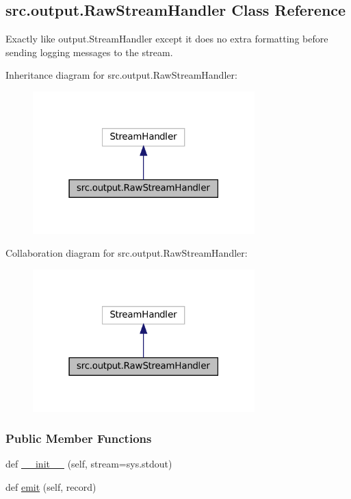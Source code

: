\hypertarget{classsrc_1_1output_1_1RawStreamHandler}{}\subsection{src.\+output.\+Raw\+Stream\+Handler Class Reference}
\label{classsrc_1_1output_1_1RawStreamHandler}


Exactly like output.\+Stream\+Handler except it does no extra formatting before sending logging messages to the stream.  




Inheritance diagram for src.\+output.\+Raw\+Stream\+Handler\+:
\nopagebreak
\begin{figure}[H]
\begin{center}
\leavevmode
\includegraphics[width=243pt]{classsrc_1_1output_1_1RawStreamHandler__inherit__graph}
\end{center}
\end{figure}


Collaboration diagram for src.\+output.\+Raw\+Stream\+Handler\+:
\nopagebreak
\begin{figure}[H]
\begin{center}
\leavevmode
\includegraphics[width=243pt]{classsrc_1_1output_1_1RawStreamHandler__coll__graph}
\end{center}
\end{figure}
\subsubsection*{Public Member Functions}
\begin{DoxyCompactItemize}
\item 
def \hyperlink{classsrc_1_1output_1_1RawStreamHandler_a2f035ce15bd29cf3ec83feed4890b5fe}{\+\_\+\+\_\+init\+\_\+\+\_\+} (self, stream=sys.\+stdout)
\item 
def \hyperlink{classsrc_1_1output_1_1RawStreamHandler_af9bdcbbd359a73a03f547a8da516b009}{emit} (self, record)
\end{DoxyCompactItemize}



